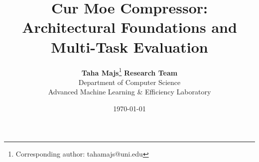 \title{\textbf{Cur Moe Compressor: Architectural Foundations and Multi-Task Evaluation}}

\author{
  \textbf{Taha Majs}\thanks{Corresponding author: tahamajs@uni.edu} \quad \textbf{Research Team} \\
  Department of Computer Science \\
  Advanced Machine Learning \& Efficiency Laboratory
}

\date{\today}
